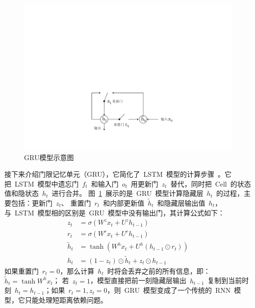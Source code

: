 \begin{figure}[!t]
  \centering
  \includegraphics[width=0.6\linewidth]{./figures/gru.pdf}
  \caption{GRU模型示意图}\label{fig:gru}
\end{figure}

接下来介绍门限记忆单元（GRU），它简化了~LSTM~模型的计算步骤~。它把~LSTM~模型中遗忘门~$f_t$~和输入门~$o_t$~用更新门~$z_t$~替代，同时把~Cell~的状态值和隐状态~$h_t$~进行合并。
图~\ref{fig:gru}~展示的是~GRU~模型计算隐藏层~$h_t$~的过程，主要包括：更新门~$z_t$、 重置门~$r_t$~和内部更新值~$\tilde h_t$~和隐藏层输出值~$h_t$，与~LSTM~模型相的区别是~GRU~模型中没有输出门，其计算公式如下：
\begin{equation}\label{equ:gru}
\begin{split}
   z_t &= \sigma ( W^z x_t+ U^z h_{t-1}) \\
   r_t &= \sigma(W^r x_t  + U^r h_{t-1}  )\\
   \tilde h_t  &= \tanh (W^h x_t  + U^h(h_{t-1} \odot r_t) ) \\
   h_t &= (1-z_t)\odot \tilde h_t  + z_t \odot h_{t-1}
\end{split}
\end{equation}
如果重置门~$r_t=0$，那么计算~$h_t$~时将会丢弃之前的所有信息，即：$\tilde h_t=\tanh W^h x_t$； 若~$z_t=1$，模型直接把前一刻隐藏层输出~$h_{t-1}$~复制到当前时刻~$h_t=h_{t-1}$；如果~$r_t=1,z_t=0$，则~GRU~模型变成了一个传统的~RNN~模型，它只能处理短距离依赖问题。




